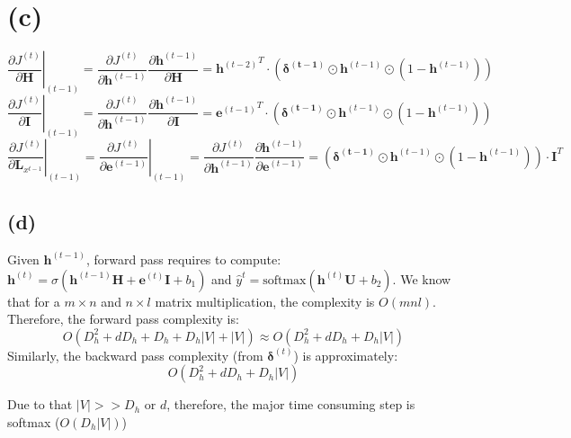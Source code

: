 \documentclass[12pt]{article}
\newcommand\at[2]{\left.#1\right|_{#2}}
\begin{document}
\section*{(c)}
$$\at{\frac{\partial J^{(t)}}{\partial \bm H}}{(t-1)} = \frac{\partial J^{(t)}}{\partial \bm h^{(t-1)}} \frac{\partial \bm h^{(t-1)}}{\partial \bm H} = {\bm h^{(t-2)}}^T \cdot \left (\bm {\delta ^{(t-1)}} \odot \bm h^{(t-1)} \odot \left (1- \bm h^{(t-1)} \right) \right )$$
$$
\at{\frac{\partial J^{(t)}}{\partial \bm I}}{(t-1)} = \frac{\partial J^{(t)}}{\partial \bm h^{(t-1)}} \frac{\partial \bm h^{(t-1)}}{\partial \bm I} = {\bm e^{(t-1)}}^T \cdot \left (\bm {\delta ^{(t-1)}} \odot \bm h^{(t-1)} \odot \left (1- \bm h^{(t-1)} \right) \right) 
$$
$$
\at{\frac{\partial J^{(t)}}{\partial \bm L_{x^{t-1}}}}{(t-1)} = \at{\frac{\partial J^{(t)}}{\partial \bm e^{(t-1)}}}{(t-1)} = \frac{\partial J^{(t)}}{\partial \bm h^{(t-1)}} \frac{\partial \bm h^{(t-1)}}{\partial \bm e^{(t-1)}} = \left (\bm {\delta ^{(t-1)}} \odot \bm h^{(t-1)} \odot \left (1- \bm h^{(t-1)} \right) \right) \cdot \bm I^T
$$

\subsection*{(d)}

Given $\bm h^{(t-1)}$, forward pass requires to compute: $\bm h^{(t)} = \sigma \left (\bm h^{(t-1)} \bm H + \bm e^{(t)} \bm I  + b_1\right )$ and $\hat y^{t} = \text{softmax} \left(\bm h^{(t)} \bm U + b_2 \right)$. We know that for a $m\times n$ and $n \times l$ matrix multiplication, the complexity is $O(mnl)$. Therefore, the forward pass complexity is:
$$
O(D_h^2 + dD_h + D_h + D_h|V| + |V|) \approx O(D_h^2 + dD_h + D_h|V|)
$$
Similarly, the backward pass complexity (from $\bm \delta^{(t)}$) is approximately:
$$
 O(D_h^2 + dD_h + D_h|V|)
$$

Due to that $|V| >> D_h \text{ or } d$, therefore, the major time consuming step is softmax ($O(D_h|V|)$)
\end{document}
